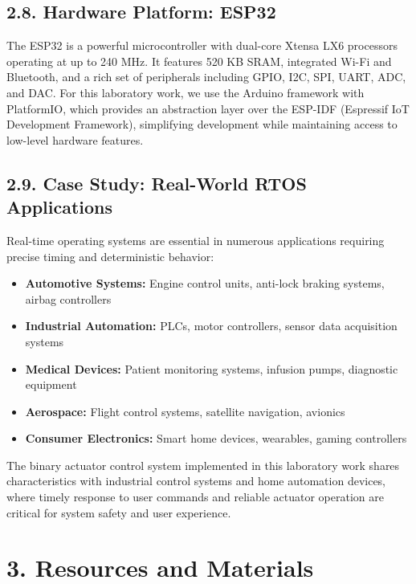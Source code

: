 \documentclass[12pt]{article}
\begin{document}
\subsection*{2.8. Hardware Platform: ESP32}

The ESP32 is a powerful microcontroller with dual-core Xtensa LX6 processors operating at up to 240 MHz. It features 520 KB SRAM, integrated Wi-Fi and Bluetooth, and a rich set of peripherals including GPIO, I2C, SPI, UART, ADC, and DAC. For this laboratory work, we use the Arduino framework with PlatformIO, which provides an abstraction layer over the ESP-IDF (Espressif IoT Development Framework), simplifying development while maintaining access to low-level hardware features.

\subsection*{2.9. Case Study: Real-World RTOS Applications}

Real-time operating systems are essential in numerous applications requiring precise timing and deterministic behavior:

\begin{itemize}
    \item \textbf{Automotive Systems:} Engine control units, anti-lock braking systems, airbag controllers
    \item \textbf{Industrial Automation:} PLCs, motor controllers, sensor data acquisition systems
    \item \textbf{Medical Devices:} Patient monitoring systems, infusion pumps, diagnostic equipment
    \item \textbf{Aerospace:} Flight control systems, satellite navigation, avionics
    \item \textbf{Consumer Electronics:} Smart home devices, wearables, gaming controllers
\end{itemize}

The binary actuator control system implemented in this laboratory work shares characteristics with industrial control systems and home automation devices, where timely response to user commands and reliable actuator operation are critical for system safety and user experience.

\section*{3. Resources and Materials}
\end{document}

